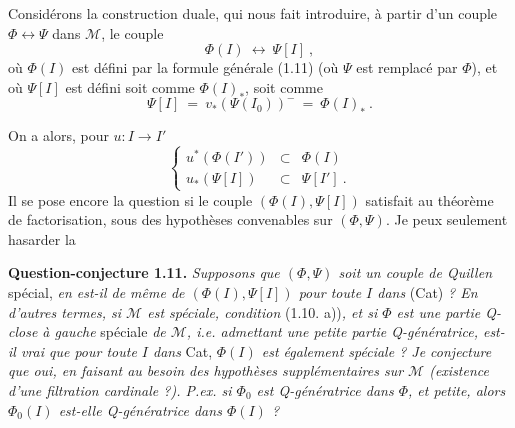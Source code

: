 \documentclass[11pt]{article}
\newcommand{\msp}[1]{\marginpar{\footnotesize [#1]}}
\newcommand{\clos}{\longleftrightarrow}
\newcommand{\fl}{\longrightarrow}
\begin{document}
Considérons la construction duale, qui nous fait introduire, à partir d'un couple $\Phi \clos \Psi$ dans $\mathcal{M}$, le couple
\[
\Phi(I) \ \clos\ \Psi[I]\ , \tag*{(1.20)}
\]
où $\Phi(I)$ est défini par la formule générale (1.11) (où $\Psi$ est remplacé par $\Phi$), et où $\Psi[I]$ est défini soit comme $\Phi(I)_{*}$, soit comme
\[
\Psi[I] \ =\ v_{*}(\Psi(I_0))^{-} \ =\ \Phi(I)_{*}\ . \tag*{(1.21)}
\]

\msp{page 12}
On a alors, pour $u : I \fl I'$
\[
\left\{
\begin{array}{rcl}
u^{*}(\Phi(I')) & \subset & \Phi(I) \\
u_{*}(\Psi[I]) & \subset & \Psi[I']\ .
\end{array}
\right.
\tag*{(1.22)}
\]
Il se pose encore la question si le couple $(\Phi(I), \Psi[I])$ satisfait au théorème de factorisation, sous des hypothèses convenables sur $(\Phi, \Psi)$. Je peux seulement hasarder la

\textbf{Question-conjecture 1.11.} \textit{Supposons que $(\Phi, \Psi)$ soit un couple de Quillen} spécial, \textit{en est-il de même de $(\Phi(I), \Psi[I])$ pour toute $I$ dans} (Cat) \textit{? En d'autres termes, si $\mathcal{M}$ est spéciale, condition} (1.10. a))\textit{, et si $\Phi$ est une partie Q-close à gauche} spéciale \textit{de $\mathcal{M}$, i.e. admettant une petite partie Q-génératrice, est-il vrai que pour toute $I$ dans} Cat, \textit{$\Phi(I)$ est également spéciale ? Je conjecture que oui, en faisant au besoin des hypothèses supplémentaires sur $\mathcal{M}$ (existence d'une filtration cardinale ?). P.ex. si $\Phi_0$ est Q-génératrice dans $\Phi$, et petite, alors $\Phi_0(I)$ est-elle Q-génératrice dans $\Phi(I)$ ?}
\end{document}
